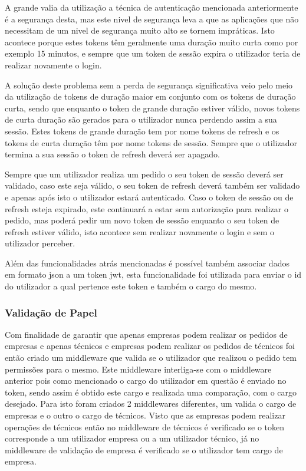 A grande valia da utilização a técnica de autenticação mencionada anteriormente é a segurança desta, mas este nivel de segurança leva a que as aplicações que não necessitam de um nivel de segurança muito alto se tornem impráticas. Isto acontece porque estes  tokens têm geralmente uma duração muito curta como por exemplo 15 minutos, e sempre que um token de sessão expira o utilizador 
teria de realizar novamente o login.

A solução deste problema sem a perda de segurança significativa veio pelo meio da utilização de tokens de duração maior em conjunto com os tokens de duração curta, sendo que enquanto o token de grande duração estiver válido, novos tokens de curta duração são gerados para o utilizador nunca perdendo assim a sua sessão. Estes tokens de grande duração tem por nome tokens de refresh e os tokens de curta duração têm por nome tokens de sessão. Sempre que o utilizador termina a sua sessão o token de refresh deverá ser apagado.

Sempre que um utilizador realiza um pedido o seu token de sessão deverá ser validado, caso este seja válido, o seu token de refresh deverá também ser validado e apenas após isto o utilizador estará autenticado. Caso o token de sessão ou de refresh esteja expirado, este continuará a estar sem autorização para realizar o pedido, mas poderá pedir um novo token de sessão enquanto o seu token de refresh estiver válido, isto acontece sem realizar novamente o login e sem o utilizador perceber.

 Além das funcionalidades atrás mencionadas é possível também associar dados em formato json a um token jwt, esta funcionalidade foi utilizada para enviar o id do utilizador a qual pertence este token e também o cargo do mesmo.

 \newpage

\subsubsection{Validação de Papel}

Com finalidade de garantir que apenas empresas podem realizar os pedidos de empresas e apenas técnicos e empresas podem realizar os pedidos de técnicos foi então criado um middleware que valida se o utilizador que realizou o pedido tem permissões para o mesmo. Este middleware interliga-se com o middleware anterior pois como mencionado o cargo do utilizador em questão é enviado no token, sendo assim é obtido este cargo e realizada uma comparação, com o cargo desejado. Para isto foram criados 2 middlewares diferentes, um valida o cargo de empresas e o outro o cargo de técnicos. Visto que as empresas podem realizar operações de técnicos então no middleware de técnicos é verificado se o token corresponde a um utilizador empresa ou a um utilizador técnico, já no middleware de validação de empresa é verificado se o utilizador tem cargo de empresa.


